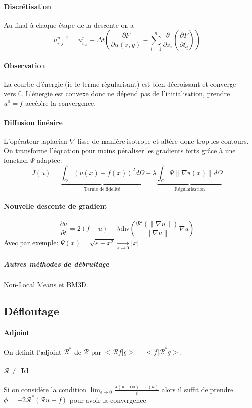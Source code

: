 \documentclass[french]{article}
\begin{document}
\paragraph{Discrétisation} Au final à chaque étape de la descente on a
$$u_{i,j}^{n+1} = u_{i,j}^n - \Delta t \left(\frac{\partial F}{\partial u(x,y)}
- \sum_{i=1}^n \frac{\partial}{\partial x_i} (\frac{\partial F}{\partial \xi_i})\right)$$

\paragraph{Observation} La courbe d'énergie (ie le terme régularisant)
est bien décroissant et converge vers 0. L'énergie est convexe donc ne
dépend pas de l'initialisation, prendre $u^0 = f$ accélère la convergence.

\paragraph{Diffusion linéaire} L'opérateur laplacien $\nabla$ lisse
de manière isotrope et altère donc trop les contours. On transforme
l'équation pour moins pénaliser les gradients forts grâce à une fonction
$\Psi$ adaptée:
$$ J(u) =
\underbrace{\int_\Omega \left( u(x) -f(x) \right)^2 d\Omega}_{\text{Terme de fidelité}}
+ \lambda \underbrace{\int_\Omega \Psi{\|\nabla u(x) \|}d\Omega}_{\text{Régularisation}}$$

\paragraph{Nouvelle descente de gradient}
$$\frac{\partial u}{\partial t} = 2(f - u) + \lambda \text{div}\left( \frac{\Psi'(\|\nabla u\|)}{\|\nabla u\|} \nabla u\right)$$
Avec par exemple: $\Psi(x) = \sqrt{\varepsilon + x^2} \xrightarrow[\varepsilon\to 0]{} \vert x \vert$

\subparagraph{Autres méthodes de débruitage} Non-Local Means et BM3D.

\subsection{Défloutage}
\paragraph{Adjoint} On définit l'adjoint $\mathcal{R}^*$ de $\mathcal{R}$
par  $<\mathcal{R}f \vert g> = <f \vert \mathcal{R}^* g>$.

\paragraph{$\mathcal{R} \neq$ Id} Si on considère la condition
$\lim_{\epsilon \to 0} \frac{J(u + \epsilon \phi) - J(u)}{\epsilon}$
alors il suffit de prendre $\phi = -2\mathcal{R}^*(\mathcal{R} u -f)$
pour avoir la convergence.
\end{document}
